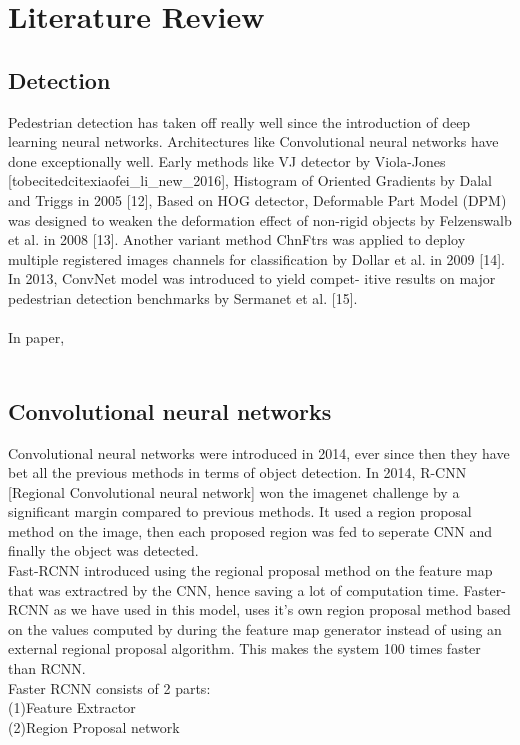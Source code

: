 \documentclass[11pt]{article}\usepackage[]{graphicx}\usepackage[]{color}
\begin{document}
\section{Literature Review}

\subsection{Detection}
Pedestrian detection has taken off really well since the introduction of deep learning neural networks. Architectures like Convolutional neural networks have done exceptionally well. Early methods like VJ detector by Viola-Jones [tobecitedcite{xiaofei\_li\_new\_2016}], Histogram of Oriented Gradients by Dalal and Triggs
in 2005 [12], Based on HOG detector, Deformable Part Model (DPM)
was designed to weaken the deformation effect of non-rigid
objects by Felzenswalb et al. in 2008 [13]. Another variant
method ChnFtrs was applied to deploy multiple registered
images channels for classification by Dollar et al. in 2009 [14].
In 2013, ConvNet model was introduced to yield compet-
itive results on major pedestrian detection benchmarks by
Sermanet et al. [15].\\
\\
In paper, \\
\\
\subsection{Convolutional neural networks}

Convolutional neural networks were introduced in 2014, ever since then they have bet all the previous methods in terms of
object detection. In 2014, R-CNN [Regional Convolutional neural network] won the imagenet challenge by a significant margin
compared to previous methods. It used a region proposal method on the image, then each proposed region was fed to seperate
CNN and finally the object was detected. \\

Fast-RCNN introduced using the regional proposal method on the feature map that was extractred by the CNN, hence saving a lot of
computation time. Faster-RCNN as we have used in this model, uses it's own region proposal method based on the values computed by
during the feature map generator instead of using an external regional proposal algorithm. This makes the system 100 times faster than
RCNN.\\

Faster RCNN consists of 2 parts:\\
(1)Feature Extractor\\
(2)Region Proposal network\\
\end{document}
